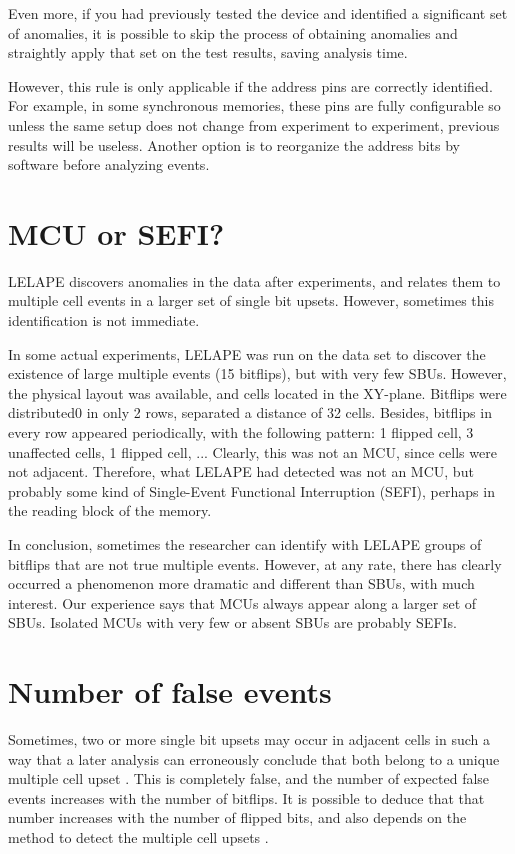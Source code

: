 Even more, if you had previously tested the device and identified a significant set of anomalies, it is possible to skip the process of obtaining anomalies and straightly apply that set on the test results, saving analysis time.

However, this rule is only applicable if the address pins are correctly identified. For example, in some synchronous memories, these pins are fully configurable so unless the same setup does not change from experiment to experiment, previous results will be useless. Another option is to reorganize the address bits by software before analyzing events.
%
\section{MCU or SEFI?}
%
LELAPE discovers anomalies in the data after experiments, and relates them to multiple cell events in a larger set of single bit upsets. However, sometimes this identification is not immediate. 

In some actual experiments, LELAPE was run on the data set to discover the existence of large multiple events (15 bitflips), but with very few SBUs. However, the physical layout was available, and cells located in the XY-plane. Bitflips were distributed0 in only 2 rows, separated a distance of 32 cells. Besides, bitflips in every row appeared periodically, with the following pattern: 1 flipped cell, 3 unaffected cells, 1 flipped cell, ... Clearly, this was not an MCU, since cells were not adjacent. Therefore, what LELAPE had detected was not an MCU, but probably some kind of Single-Event Functional Interruption (SEFI), perhaps in the reading block of the memory.

In conclusion, sometimes the researcher can identify with LELAPE groups of bitflips that are not true multiple events. However, at any rate, there has clearly occurred a phenomenon more dramatic and different than SBUs, with much interest. Our experience says that MCUs always appear along a larger set of SBUs. Isolated MCUs with very few or absent SBUs are probably SEFIs.
%
\section{Number of false events}
%
Sometimes, two or more single bit upsets may occur in adjacent cells in such a way that a later analysis can erroneously conclude that both belong to a unique multiple cell upset \cite{Tausch2009}. This is completely false, and the number of expected false events increases with the number of bitflips. It is possible to deduce that that number increases with the number of flipped bits, and also depends on the method to detect the multiple cell upsets \cite{Franco2020}. 

